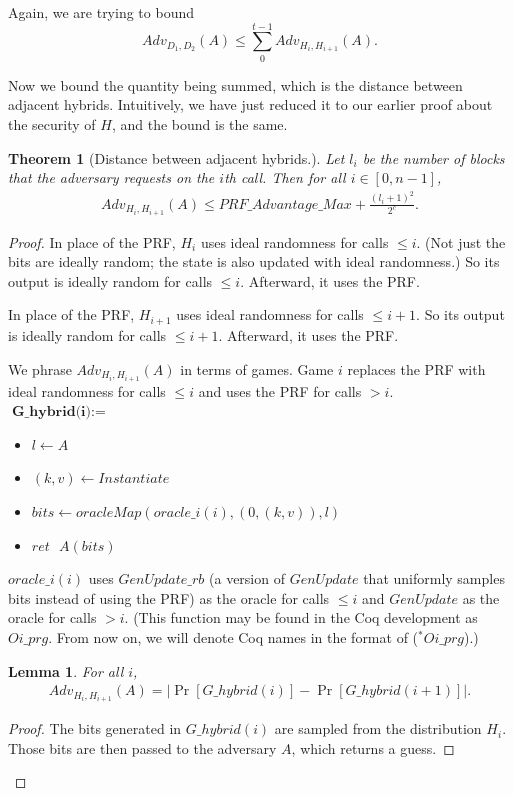 \documentclass[12pt,lot, lof]{puthesis}
\newenvironment{game}
{ \begin{itemize}[noitemsep,nolistsep] 
}
{ \end{itemize}                  }
\newcommand{\s} {\textrm{ }}
\newcommand{\f}{\frac}
\newcommand{\lar}{\leftarrow}
\newtheorem{thm}{Theorem}
\newtheorem{lem}{Lemma}[thm]
\begin{document}
Again, we are trying to bound
$$Adv_{D_1, D_2}(A) \leq \sum_{0}^{t-1} Adv_{H_i, H_{i+1}}(A).$$

Now we bound the quantity being summed, which is the distance between adjacent hybrids. Intuitively, we have just reduced it to our earlier proof about the security of $H$, and the bound is the same.

\begin{thm}[Distance between adjacent hybrids.] \label{thm:adjacent_hybrids}
Let $l_i$ be the number of blocks that the adversary requests on the $i$th call. Then for all $i \in [0,n-1]$,
\begin{gather*}
Adv_{H_i, H_{i+1}}(A) \leq PRF\_Advantage\_Max + \f{(l_i+1)^2}{2^c}.
\end{gather*} \end{thm}
\begin{proof} 

In place of the PRF, $H_i$ uses ideal randomness for calls $\leq i$. (Not just the bits are ideally random; the state is also updated with ideal randomness.) So its output is ideally random for calls $\leq i$. Afterward, it uses the PRF.

In place of the PRF, $H_{i+1}$ uses ideal randomness for calls $\leq i + 1$. So its output is ideally random for calls $\leq i+1$. Afterward, it uses the PRF.

We phrase $Adv_{H_i, H_{i+1}}(A)$ in terms of games. Game $i$ replaces the PRF with ideal randomness for calls $\leq i$ and uses the PRF for calls $> i$.\\

$\textbf{G\_hybrid(i)} := $
\begin{game}
\item[] $l \leftarrow A$
\item[] $(k,v) \leftarrow Instantiate$
\item[] $bits \lar oracleMap(oracle\_i(i),(0, (k, v)),l)$
\item[] $ret \s A(bits)$ \\
\end{game}

$oracle\_i(i)$ uses $GenUpdate\_rb$ (a version of $GenUpdate$ that uniformly samples bits instead of using the PRF) as the oracle for calls $\leq i$ and $GenUpdate$ as the oracle for calls $> i$. (This function may be found in the Coq development as $Oi\_prg$. From now on, we will denote Coq names in the format of ($^*Oi\_prg$).)

\begin{lem}For all $i$, 
\begin{gather*}
Adv_{H_i, H_{i+1}}(A) = |\Pr[G\_hybrid(i)] - \Pr[G\_hybrid(i+1)]|.
\end{gather*}
\end{lem}
\begin{proof} The bits generated in $G\_hybrid(i)$ are sampled from the distribution $H_i$. Those bits are then passed to the adversary $A$, which returns a guess. %
\end{proof}


\end{proof}
\end{document}
